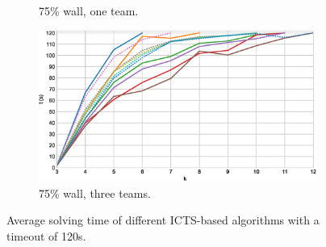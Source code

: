 \documentclass[english]{article}
\newcommand\graphwidth{0.49\textwidth}
\begin{document}
\begin{figure}[t]
\begin{subfigure}{\graphwidth}
			\caption{75\% wall, one team.}
			\label{fig:i-75-1}
		\end{subfigure}
		\begin{subfigure}{\graphwidth}
			\centering
			\includegraphics[width=\linewidth]{img/results/icts-comparison/75-3}
			\caption{75\% wall, three teams.}
			\label{fig:i-75-3}
		\end{subfigure}
		\caption{Average solving time of different ICTS-based algorithms with a timeout of 120s.}
		\label{fig:i-times}
	\end{figure}
\end{document}
